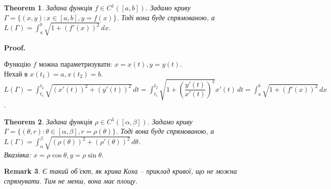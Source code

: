\documentclass[a4paper, 10pt]{article}
\makeatletter
\def\huge{\displaystyle}
\theoremstyle{theoremdd}
\newtheorem{theorem}{Theorem}[subsection]
\theoremstyle{theoremdd}
\theoremstyle{theoremdd}
\theoremstyle{theoremdd}
\theoremstyle{theoremdd}
\theoremstyle{theoremdd}
\theoremstyle{theoremdd}
\newtheorem{remark}[theorem]{Remark}
\theoremstyle{theoremdd}
\theoremstyle{theoremdd}
\renewenvironment{proof}[1][Proof.\\]{\par
\pushQED{\hfill \qed}%
\normalfont \topsep6\p@\@plus6\p@\relax
\trivlist
\item\relax
{\bfseries
#1\@addpunct{.}}\hspace\labelsep\ignorespaces
}{%
\popQED\endtrivlist\@endpefalse
}
\makeatother
\begin{document}
\begin{theorem}
Задана функція $f \in C^1([a,b])$. Задамо криву $\Gamma = \{(x,y): x \in [a,b], y = f(x) \}$. Тоді вона буде спрямованою, а $L(\Gamma) = \huge\int_a^b \sqrt{1+(f'(x))^2}\,dx$.
\end{theorem}

\begin{proof}
Функцію $f$ можна параметризувати: $x = x(t), y = y(t)$.\\
Нехай в $x(t_1) = a, x(t_2) = b$.\\
$L(\Gamma) = \huge\int_{t_1}^{t_2} \sqrt{(x'(t))^2 + (y'(t))^2}\,dt = \int_{t_1}^{t_2} \sqrt{1 + \left(\dfrac{y'(t)}{x'(t)}\right)^2} x'(t)\,dt = \int_a^b \sqrt{1+(f'(x))^2}\,dx$.
\end{proof}

\begin{theorem}
Задана функція $\rho \in C^1([\alpha,\beta])$. Задамо криву $\Gamma = \{ (\theta,r): \theta \in [\alpha,\beta], r = \rho (\theta) \}$. Тоді вона буде спрямованою, а $L(\Gamma) = \huge\int_{\alpha}^{\beta} \sqrt{(\rho (\theta))^2 + (\rho'(\theta))^2}\,d\theta$.\\
\textit{Вказівка: $x = \rho \cos \theta, y = \rho \sin \theta$}.
\end{theorem}

\begin{remark}
Є такий об'єкт, як крива Коха -- приклад кривої, що не можна спрямувати. Тим не менш, вона має площу.
\end{remark}
\end{document}
